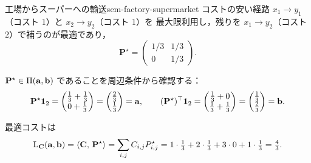 \begin{example}{工場からスーパーへの輸送}{sem-factory-supermarket}
  コストの安い経路 $x_1 \to y_1$（コスト $1$）と $x_2 \to y_2$（コスト $1$）を
  最大限利用し，残りを $x_1 \to y_2$（コスト $2$）で補うのが最適であり，
  \[
    \mathbf{P}^{\star} =
    \begin{pmatrix}
      1/3 & 1/3 \\
      0 & 1/3
    \end{pmatrix}.
  \]

  $\mathbf{P}^{\star} \in \Pi(\mathbf{a}, \mathbf{b})$ であることを周辺条件から確認する：
  \[
    \mathbf{P}^{\star}\mathbf{1}_2
    = \begin{pmatrix} \tfrac{1}{3} + \tfrac{1}{3} \\ 0 + \tfrac{1}{3} \end{pmatrix}
    = \begin{pmatrix} \tfrac{2}{3} \\ \tfrac{1}{3} \end{pmatrix}
    = \mathbf{a},
    \qquad
    (\mathbf{P}^{\star})^\top\mathbf{1}_2
    = \begin{pmatrix} \tfrac{1}{3} + 0 \\ \tfrac{1}{3} + \tfrac{1}{3} \end{pmatrix}
    = \begin{pmatrix} \tfrac{1}{3} \\ \tfrac{2}{3} \end{pmatrix}
    = \mathbf{b}.
  \]


  最適コストは
  \[
    \mathrm{L}_{\mathbf{C}}(\mathbf{a}, \mathbf{b})
    = \langle \mathbf{C},\, \mathbf{P}^{\star} \rangle
    = \sum_{i,j} C_{i,j} P_{i,j}^{\star}
    = 1 \cdot \tfrac{1}{3} + 2 \cdot \tfrac{1}{3} + 3 \cdot 0 + 1 \cdot \tfrac{1}{3}
    = \tfrac{4}{3}.
  \]


\end{example}
